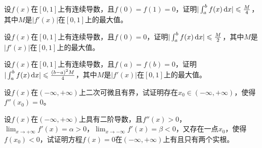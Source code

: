 \begin{example}
	设$f(x)$在$[0,1]$上有连续导数，且$f(0)=f(1)=0$，证明$|\int_{a}^{b}f(x)\,\mathrm{d} x|\leqslant\frac{M}{4}$，其中$M$是$|f'(x)|$在$[0,1]$上的最大值。
\end{example}

\begin{example}
	设$f(x)$在$[0,1]$上有连续导数，且$f(0)=0$，证明$|\int_{a}^{b}f(x)\,\mathrm{d} x|\leqslant\frac{M}{2}$，其中$M$是$|f'(x)|$在$[0,1]$上的最大值。
\end{example}

\begin{example}
	设$f(x)$在$[0,1]$上有连续导数，且$f(a)=f(b)=0$，证明$|\int_{a}^{b}f(x)\,\mathrm{d} x|\leqslant\frac{(b-a)^2M}{4}$，其中$M$是$|f'(x)|$在$[0,1]$上的最大值。
\end{example}

\begin{example}
	设$f(x)$在$(-\infty,+\infty)$上二次可微且有界，试证明存在$x_0\in(-\infty,+\infty)$，使得$f''(x_0)=0$。
\end{example}

\begin{example}
	设$f(x)$在$(-\infty,+\infty)$上具有二阶导数，且$f''(x)>0$，$\lim_{x\to+\infty}f'(x)=\alpha>0$，$\lim_{x\to-\infty}f'(x)=\beta<0$，又存在一点$x_0$，使得$f(x_0)<0$，试证明方程$f(x)=0$在$(-\infty,+\infty)$上有且只有两个实根。
\end{example}
